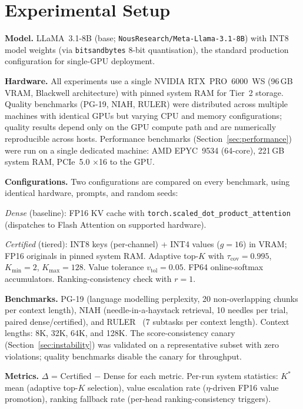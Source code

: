 \documentclass[11pt,a4paper]{article}
\theoremstyle{definition}
\theoremstyle{remark}
\newcommand{\torchsdpa}{\texttt{torch.scaled\_dot\_\hspace{0pt}product\_attention}}
\begin{document}
\section{Experimental Setup}
\label{sec:setup}

\textbf{Model.}  LLaMA~3.1-8B (base; \texttt{NousResearch/Meta-Llama-3.1-8B}) with INT8 model weights (via \texttt{bitsandbytes} 8-bit quantisation), the standard production configuration for single-GPU deployment.

\textbf{Hardware.}  All experiments use a single NVIDIA RTX~PRO~6000~WS (96\,GB VRAM, Blackwell architecture) with pinned system RAM for Tier~2 storage.  Quality benchmarks (PG-19, NIAH, RULER) were distributed across multiple machines with identical GPUs but varying CPU and memory configurations; quality results depend only on the GPU compute path and are numerically reproducible across hosts.  Performance benchmarks (Section~\ref{sec:performance}) were run on a single dedicated machine: AMD EPYC~9534 (64-core), 221\,GB system RAM, PCIe~5.0 $\times$16 to the GPU.

\textbf{Configurations.}  Two configurations are compared on every benchmark, using identical hardware, prompts, and random seeds:

\emph{Dense} (baseline): FP16 KV cache with \torchsdpa{} (dispatches to Flash Attention on supported hardware).

\emph{Certified} (tiered): INT8 keys (per-channel) + INT4 values ($g{=}16$) in VRAM; FP16 originals in pinned system RAM.  Adaptive top-$K$ with $\tau_{\mathrm{cov}}{=}0.995$, $K_{\min}{=}2$, $K_{\max}{=}128$.  Value tolerance $v_{\mathrm{tol}}{=}0.05$.  FP64 online-softmax accumulators.  Ranking-consistency check with $r{=}1$.

\textbf{Benchmarks.}  PG-19 (language modelling perplexity, 20 non-overlapping chunks per context length), NIAH (needle-in-a-haystack retrieval, 10 needles per trial, paired dense/certified), and RULER~\cite{ruler} (7 subtasks per context length).  Context lengths: 8K, 32K, 64K, and 128K.  The score-consistency canary (Section~\ref{sec:instability}) was validated on a representative subset with zero violations; quality benchmarks disable the canary for throughput.

\textbf{Metrics.}  $\Delta$ = Certified $-$ Dense for each metric.  Per-run system statistics: $K^*$ mean (adaptive top-$K$ selection), value escalation rate ($\eta$-driven FP16 value promotion), ranking fallback rate (per-head ranking-consistency triggers).
\end{document}
